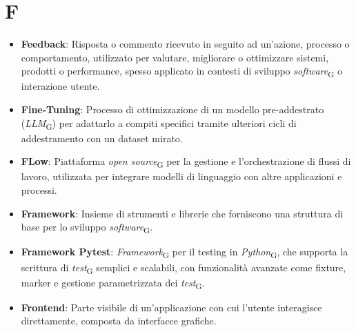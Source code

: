 \section{F}
\begin{itemize}
    \item \textbf{Feedback}: Risposta o commento ricevuto in seguito ad un'azione, processo o comportamento, utilizzato per valutare, migliorare o ottimizzare sistemi, prodotti o performance, spesso applicato in contesti di sviluppo \textit{software}\textsubscript{G} o interazione utente.
    \item \textbf{Fine-Tuning}: Processo di ottimizzazione di un modello pre-addestrato (\textit{LLM}\textsubscript{G}) per adattarlo a compiti specifici tramite ulteriori cicli di addestramento con un dataset mirato.
    \item \textbf{FLow}: Piattaforma \textit{open source}\textsubscript{G} per la gestione e l'orchestrazione di flussi di lavoro, utilizzata per integrare modelli di linguaggio con altre applicazioni e processi.
    \item \textbf{Framework}: Insieme di strumenti e librerie che forniscono una struttura di base per lo sviluppo \textit{software}\textsubscript{G}.
    \item \textbf{Framework Pytest}:  \textit{Framework}\textsubscript{G} per il testing in \textit{Python}\textsubscript{G}, che supporta la scrittura di \textit{test}\textsubscript{G} semplici e scalabili, con funzionalità avanzate come fixture, marker e gestione parametrizzata dei \textit{test}\textsubscript{G}.
    
    \item \textbf{Frontend}: Parte visibile di un'applicazione con cui l'utente interagisce direttamente, composta da interfacce grafiche.
\end{itemize}
